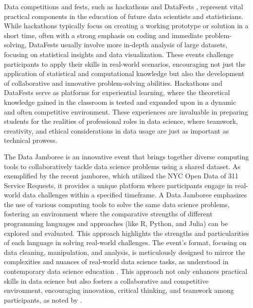 \documentclass[12pt, letterpaper]{article}
\begin{document}
Data competitions and fests, such as hackathons \citep{lara2016hackathons} and
DataFests \citep{noll2023insights}, represent vital practical components in the
education of future data scientists and statisticians. While hackathons
typically focus on creating a working prototype or solution in a short time,
often with a strong emphasis on coding and immediate problem-solving, DataFests
usually involve more in-depth analysis of large datasets, focusing on
statistical insights and data visualization. These events challenge
participants to apply their skills in real-world scenarios, encouraging not just
the application of statistical and computational knowledge but also the
development of collaborative and innovative problem-solving
abilities. Hackathons and DataFests serve as platforms for experiential
learning, where the theoretical knowledge gained in the classroom is tested and
expanded upon in a dynamic and often competitive environment. These experiences
are invaluable in preparing students for the realities of professional roles in
data science, where teamwork, creativity, and ethical considerations in data
usage are just as important as technical prowess.


The Data Jamboree is an innovative event that brings together diverse computing
tools to collaboratively tackle data science problems using a shared dataset. As
exemplified by the recent jamboree, which utilized the NYC Open Data of 311
Service Requests, it provides a unique platform where participants engage in
real-world data challenges within a specified timeframe. A Data Jamboree
emphasizes the use of various computing tools to solve the same data science
problems, fostering an environment where the comparative strengths of different
programming languages and approaches (like R, Python, and Julia) can be explored
and evaluated. This approach highlights the strengths and particularities of each
language in solving real-world challenges. The event's format,
focusing on data cleaning, manipulation, and analysis, is meticulously designed
to mirror the complexities and nuances of real-world data science tasks, as
understood in contemporary data science education
\citep{nolan2010computing}. This approach not only enhances practical skills in
data science but also fosters a collaborative and competitive environment,
encouraging innovation, critical thinking, and teamwork among participants, as
noted by \citet{dalzell2023increasing}.
\end{document}
